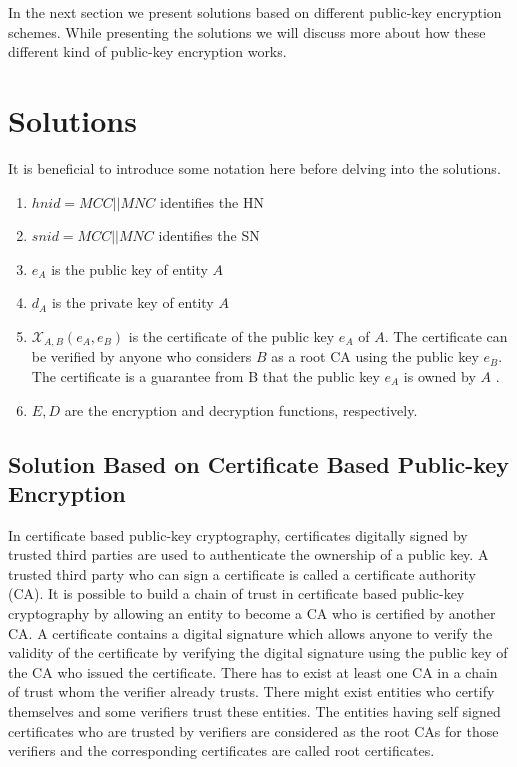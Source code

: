 \documentclass[runningheads,a4paper]{llncs} %
\begin{document}
In the next section we present solutions based on different public-key encryption schemes. While presenting the solutions we will discuss more about how these different kind of public-key encryption works.

\section{Solutions}\label{sec:solutions} 
\label{sec:solutions}
It is beneficial to introduce some notation here before delving into the solutions. 
\begin{enumerate}
\item $hnid=MCC||MNC$ identifies the HN
\item $snid=MCC||MNC$ identifies the SN
\item $e_A$ is the public key of entity $A$
\item $d_A$ is the private key of entity $A$ 
\item $\mathcal{X}_{A,B}(e_A,e_B)$ is the certificate of the public key $e_A$ of $A$. The certificate can be verified by anyone who considers $B$ as a root CA using the public key $e_B$. The certificate is a guarantee from B that the public key $e_A$ is owned by $A$ .
\item $E,D$ are the encryption and decryption functions, respectively.
\end{enumerate}


\subsection{Solution Based on Certificate Based Public-key Encryption} 
\label{sub_sec:solution_certificate}
In certificate based public-key cryptography, certificates digitally signed by trusted third parties are used to authenticate the ownership of a public key. A trusted third party who can sign a certificate is called a certificate authority (CA). It is possible to build a chain of trust in certificate based public-key cryptography by allowing an entity to become a CA who is certified by another CA. A certificate contains a digital signature which allows anyone to verify the validity of the certificate by verifying the digital signature using the public key of the CA who issued the certificate. There has to exist at least one CA in a chain of trust whom the verifier already trusts. There might exist entities who certify themselves and some verifiers trust these entities. The entities having self signed certificates who are trusted by verifiers are considered as the root CAs for those verifiers and the corresponding certificates are called root certificates. 
\end{document}
